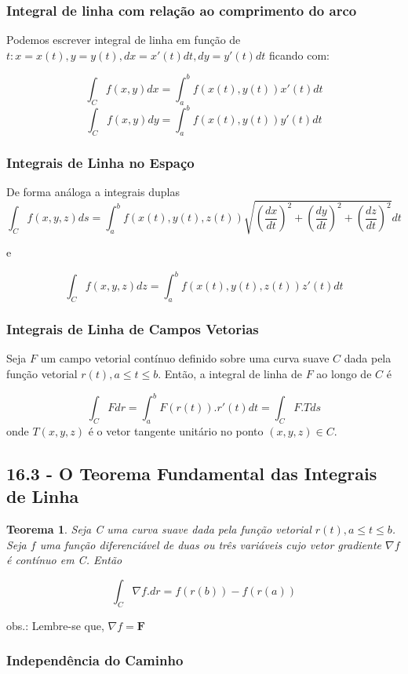 \documentclass[12pt]{article}
\newtheorem{theorem}{Teorema}[section]
\begin{document}
\subsubsection*{Integral de linha com relação ao comprimento do arco}
Podemos escrever integral de linha em função de $t: x = x(t), y = y(t), dx = x'(t)dt, dy = y'(t)dt$ ficando com:

$$\int_{C} f(x, y) dx = \int_{a}^{b} f(x(t), y(t))x'(t)dt$$
$$\int_{C} f(x, y) dy = \int_{a}^{b} f(x(t), y(t))y'(t)dt$$

\subsubsection*{Integrais de Linha no Espaço}
De forma análoga a integrais duplas
$$\int_{C} f(x, y, z) ds = \int_{a}^{b} f(x(t), y(t), z(t)) \sqrt{\left(\frac{dx}{dt}\right)^2 + \left(\frac{dy}{dt}\right)^2 + \left(\frac{dz}{dt}\right)^2} dt$$

e

$$\int_{C} f(x, y, z) dz = \int_{a}^{b} f(x(t), y(t), z(t))z'(t)dt$$

\subsubsection*{Integrais de Linha de Campos Vetorias}

Seja $F$ um campo vetorial contínuo definido sobre uma curva suave $C$ dada pela função vetorial $r(t), a \leq t \leq b$. Então, a integral de linha de $F$ ao longo de $C$ é

$$\int_C F dr = \int_{a}^{b} F(r(t)).r'(t) dt = \int_C F . T ds$$
onde $T(x, y, z)$ é o vetor tangente unitário no ponto $(x, y, z) \in C$.

\subsection*{16.3 - O Teorema Fundamental das Integrais de Linha}
\begin{theorem}
    Seja C uma curva suave dada pela função vetorial $r(t), a \leq t \leq b$. Seja $f$ uma função diferenciável de duas ou três variáveis cujo vetor gradiente $\nabla f$ é contínuo em C. Então

    $$\int_C \nabla f . dr = f(r(b)) - f(r(a))$$
\end{theorem}

obs.: Lembre-se que, $\nabla f = \textbf{F}$

\subsubsection*{Independência do Caminho}
\end{document}
